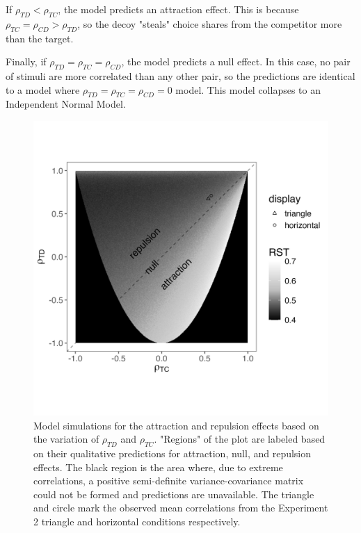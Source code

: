 If $\rho_{TD}<\rho_{TC}$, the model predicts an attraction effect. This is because $\rho_{TC}=\rho_{CD}>\rho_{TD}$, so the decoy "steals" choice shares from the competitor more than the target. 

Finally, if $\rho_{TD}=\rho_{TC}=\rho_{CD}$, the model predicts a null effect. In this case, no pair of stimuli are more correlated than any other pair, so the predictions are identical to a model where $\rho_{TD}=\rho_{TC}=\rho_{CD}=0$ model. This model collapses to an Independent Normal Model. 

\begin{figure}
   \includegraphics[width=\linewidth]{figures/3d_sim_rst.jpg}
   \caption{Model simulations for the attraction and repulsion effects based on the variation of $\rho_{TD}$ and $\rho_{TC}$. "Regions" of the plot are labeled based on their qualitative predictions for attraction, null, and repulsion effects. The black region is the area where, due to extreme correlations, a positive semi-definite variance-covariance matrix could not be formed and predictions are unavailable. The triangle and circle mark the observed mean correlations from the Experiment 2 triangle and horizontal conditions respectively.}
   \label{fig:3d_model}
\end{figure}

